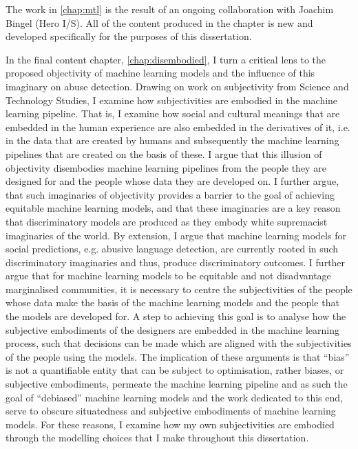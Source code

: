 The work in \cref{chap:mtl} is the result of an ongoing collaboration with Joachim Bingel (Hero I/S).
All of the content produced in the chapter is new and developed specifically for the purposes of this dissertation.

In the final content chapter, \cref{chap:disembodied}, I turn a critical lens to the proposed objectivity of machine learning models and the influence of this imaginary on abuse detection.
Drawing on work on subjectivity from Science and Technology Studies, I examine how subjectivities are embodied in the machine learning pipeline.
That is, I examine how social and cultural meanings that are embedded in the human experience are also embedded in the derivatives of it, i.e. in the data that are created by humans and subsequently the machine learning pipelines that are created on the basis of these.
I argue that this illusion of objectivity \citep{Haraway:1988} disembodies machine learning pipelines from the people they are designed for and the people whose data they are developed on.
I further argue, that such imaginaries of objectivity provides a barrier to the goal of achieving equitable machine learning models, and that these imaginaries are a key reason that discriminatory models are produced as they embody white supremacist imaginaries of the world.
By extension, I argue that machine learning models for social predictions, e.g. abusive language detection, are currently rooted in such discriminatory imaginaries and thus, produce discriminatory outcomes.
I further argue that for machine learning models to be equitable and not disadvantage marginalised communities, it is necessary to centre the subjectivities of the people whose data make the basis of the machine learning models and the people that the models are developed for.
A step to achieving this goal is to analyse how the subjective embodiments of the designers are embedded in the machine learning process, such that decisions can be made which are aligned with the subjectivities of the people using the models.
The implication of these arguments is that ``bias'' is not a quantifiable entity that can be subject to optimisation, rather biases, or subjective embodiments, permeate the machine learning pipeline and as such the goal of ``debiased'' machine learning models and the work dedicated to this end, serve to obscure situatedness and subjective embodiments of machine learning models.
For these reasons, I examine how my own subjectivities are embodied through the modelling choices that I make throughout this dissertation.

